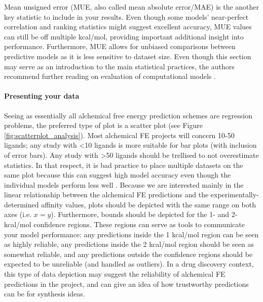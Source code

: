 \documentclass[9pt,bestpractices]{livecoms}
\begin{document}
%
Mean unsigned error (MUE, also called mean absolute error/MAE) is the another key statistic to include in your results. Even though some models' near-perfect correlation and ranking statistics might suggest excellent accuracy, MUE values can still be off multiple kcal/mol, providing important additional insight into performance. Furthermore, MUE allows for unbiased comparisons between predictive models as it is less sensitive to dataset size. Even though this section may serve as an introduction to the main statistical practices, the authors recommend further reading on evaluation of computational models \cite{jain2008recommendations, walters2013what, brown2009healthy, walterthoughts}.
%
\paragraph{Presenting your data}
Seeing as essentially all alchemical free energy prediction schemes are regression problems, the preferred type of plot is a scatter plot (see Figure \ref{fig:scatterplot_analysis}). Most alchemical FE projects will concern 10-50 ligands; any study with \textless10 ligands is more suitable for bar plots (with inclusion of error bars). Any study with \textgreater50 ligands should be trellised to not overestimate statistics. In that respect, it is bad practice to place multiple datasets on the same plot because this can suggest high model accuracy even though the individual models perform less well \cite{walterthoughts}.
%
Because we are interested mainly in the linear relationship between the alchemical FE predictions and the experimentally-determined affinity values, plots should be depicted with the same range on both axes (i.e. $x=y$). Furthermore, bounds should be depicted for the 1- and 2-kcal/mol confidence regions. These regions can serve as tools to communicate your model performance: any predictions inside the 1 kcal/mol region can be seen as highly reliable, any predictions inside the 2 kcal/mol region should be seen as somewhat reliable, and any predictions outside the confidence regions should be expected to be unreliable (and handled as outliers). In a drug discovery context, this type of data depiction may suggest the reliability of alchemical FE predictions in the project, and can give an idea of how trustworthy predictions can be for synthesis ideas. 
\end{document}
